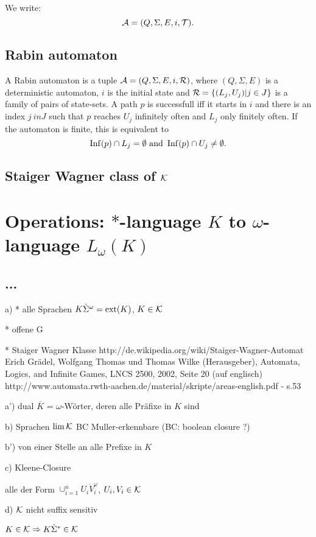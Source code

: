 We write:
\[ \mathcal{A} = (Q, \Sigma, E, i, \mathcal{T}) . \]

\subsection{Rabin automaton}
A Rabin automaton is a tuple $\mathcal{A} = (Q, \Sigma, E, i, \mathcal{R})$, where $(Q,\Sigma,E)$ is a deterministic automaton, $i$ is the initial state and $\mathcal{R} = \{(L_j, U_j) | j \in J\}$ is a family of pairs of state-sets. A path $p$ is successfull iff it starts in $i$ and there is an index $j \ in J$ such that $p$ reaches $U_j$ infinitely often and $L_j$ only finitely often. If the automaton is finite, this is equivalent to
\[ \Inf(p) \cap L_j = \emptyset \ \text{and} \ \Inf(p) \cap U_j \neq \emptyset . \]

\subsection{Staiger Wagner class of $\mathcal{K}$}

\section{Operations: $*$-language $K$ to $\omega$-language $L_\omega (K)$}
\subsection{...}
a)
* alle Sprachen $K \dot \Sigma^\omega = \operatorname{ext}(K)$, $K \in \mathcal{K}$

* offene G

* Staiger Wagner Klasse
http://de.wikipedia.org/wiki/Staiger-Wagner-Automat
Erich Grädel, Wolfgang Thomas und Thomas Wilke (Herausgeber), Automata, Logics, and Infinite Games, LNCS 2500, 2002, Seite 20 (auf englisch)
http://www.automata.rwth-aachen.de/material/skripte/areas-english.pdf - s.53

a')
dual $\overline{K}$ = $\omega$-Wörter, deren alle Präfixe in $K$ sind

b) Sprachen $\lim \mathcal{K}$
BC Muller-erkennbare
(BC: boolean closure ?)

b') von einer Stelle an alle Prefixe in $K$

c) Kleene-Closure

alle der Form $\cup_{i=1}^n U_i \dot V_i^\omega$, $U_i, V_i \in \mathcal{K}$

d) $\mathcal{K}$ nicht suffix sensitiv

$K \in \mathcal{K} \Rightarrow K \dot \Sigma^* \in \mathcal{K}$  
